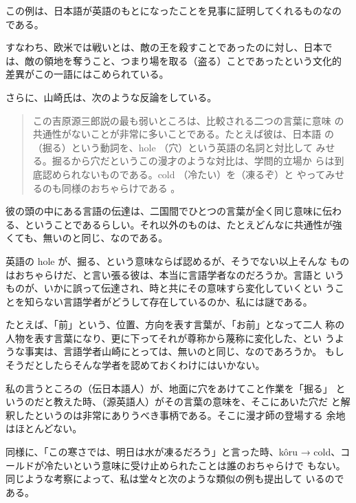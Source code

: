 \noindent
この例は、日本語が英語のもとになったことを見事に証明してくれるものなの
である。

  すなわち、欧米では戦いとは、敵の王を殺すことであったのに対し、日本で
は、敵の領地を奪うこと、つまり場を取る（盗る）ことであったという文化的
差異がこの一語にはこめられている。

  さらに、山崎氏は、次のような反論をしている。

\begin{quote}
    この吉原源三郎説の最も弱いところは、比較される二つの言葉に意味
    の共通性がないことが非常に多いことである。たとえば彼は、日本語
    の（掘る）という動詞を、hole （穴）という英語の名詞と対比して
    みせる。掘るから穴だというこの漫才のような対比は、学問的立場か
    らは到底認められないものである。cold （冷たい）を（凍るぞ）と
    やってみせるのも同様のおちゃらけである \cite[96]{山崎91b}。
\end{quote}
\noindent
彼の頭の中にある言語の伝達は、二国間でひとつの言葉が全く同じ意味に伝わ
る、ということであるらしい。それ以外のものは、たとえどんなに共通性が強
くても、無いのと同じ、なのである。

  英語の hole が、掘る、という意味ならば認めるが、そうでない以上そんな
ものはおちゃらけだ、と言い張る彼は、本当に言語学者なのだろうか。言語と
いうものが、いかに誤って伝達され、時と共にその意味すら変化していくとい
うことを知らない言語学者がどうして存在しているのか、私には謎である。

  たとえば、「前」という、位置、方向を表す言葉が、「お前」となって二人
称の人物を表す言葉になり、更に下ってそれが尊称から蔑称に変化した、とい
うような事実は、言語学者山崎にとっては、無いのと同じ、なのであろうか。
もしそうだとしたらそんな学者を認めておくわけにはいかない。

  私の言うところの（伝日本語人）が、地面に穴をあけてこと作業を「掘る」
というのだと教えた時、（源英語人）がその言葉の意味を、そこにあいた穴だ
と解釈したというのは非常にありうべき事柄である。そこに漫才師の登場する
余地はほとんどない。

  同様に、「この寒さでは、明日は水が凍るだろう」と言った時、k\^oru → 
cold、コールドが冷たいという意味に受け止められたことは誰のおちゃらけで
もない。同じような考察によって、私は堂々と次のような類似の例も提出して
いるのである。


